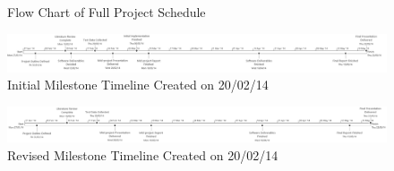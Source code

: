 \begin{figure}[h]
	\centering
	\caption{Flow Chart of Full Project Schedule}
	\label{fig:full-project-process}
\end{figure}

\begin{landscape}	
	\begin{figure}
		\centering
		\centerline{ \includegraphics[scale=0.475]{figures/schedule/initial_schedule_timeline.pdf} }
		\caption{Initial Milestone Timeline Created on 20/02/14}
		\label{fig:initial-milestone-timeline}
	\end{figure}

	\begin{figure}
		\centering
		\centerline{ \includegraphics[scale=0.475]{figures/schedule/revised_schedule_timeline.pdf} }
		\caption{Revised Milestone Timeline Created on 20/02/14}
		\label{fig:revised-milestone-timeline}
	\end{figure}	
\end{landscape}



